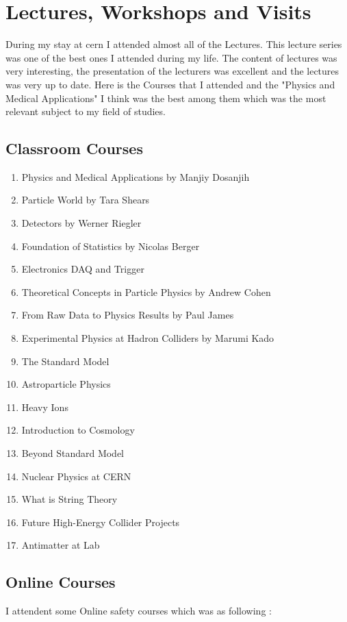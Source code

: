 \documentclass[12pt,a4paper]{article}
\begin{document}
\section{Lectures, Workshops and Visits}
During my stay at cern I attended almost all of the Lectures. This lecture series was one of the best ones I attended during my life. The content of lectures was very interesting, the presentation of the lecturers was excellent and the lectures was very up to date. Here is the Courses that I attended and the "Physics and Medical Applications" I think was the best among them which was the most relevant subject to my field of studies.
\subsection{Classroom Courses}

\begin{enumerate}

\item Physics and Medical Applications by Manjiy Dosanjih
\item Particle World by Tara Shears
\item Detectors by Werner Riegler
\item Foundation of Statistics by Nicolas Berger
\item Electronics DAQ and Trigger
\item Theoretical Concepts in Particle Physics by Andrew Cohen
\item From Raw Data to Physics Results by Paul James
\item Experimental Physics at Hadron Colliders by Marumi Kado
\item The Standard Model
\item Astroparticle Physics
\item Heavy Ions
\item Introduction to Cosmology
\item Beyond Standard Model
\item Nuclear Physics at CERN
\item What is String Theory
\item Future High-Energy Collider Projects
\item Antimatter at Lab

\end{enumerate}


\subsection{Online Courses}
I attendent some Online safety courses which was as following :
\end{document}
